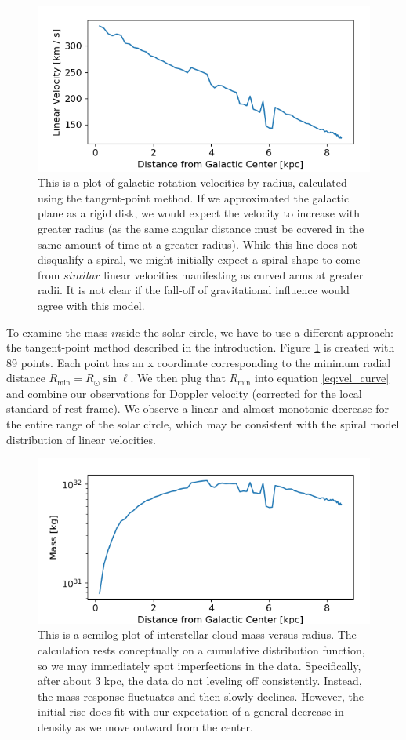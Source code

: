\documentclass[12pt]{article}
\begin{document}
\begin{figure}
	\centering
	\includegraphics[width=.8\linewidth]{inner_vel_distro}
	\caption{This is a plot of galactic rotation velocities by radius, calculated using the tangent-point method. If we approximated the galactic plane as a rigid disk, we would expect the velocity to increase with greater radius (as the same angular distance must be covered in the same amount of time at a greater radius). While this line does not disqualify a spiral, we might initially expect a spiral shape to come from $similar$ linear velocities manifesting as curved arms at greater radii. It is not clear if the fall-off of gravitational influence would agree with this model.}
	\label{fig:inner_vel_distro}
\end{figure}

To examine the mass $in$side the solar circle, we have to use a different approach: the tangent-point method described in the introduction. Figure \ref{fig:inner_vel_distro} is created with 89 points. Each point has an x coordinate corresponding to the minimum radial distance $R_\text{min} = R_\odot \sin \ell$. We then plug that $R_\text{min}$ into equation \ref{eq:vel_curve} and combine our observations for Doppler velocity (corrected for the local standard of rest frame). We observe a linear and almost monotonic decrease for the entire range of the solar circle, which may be consistent with the spiral model distribution of linear velocities.

\begin{figure}
	\centering
	\includegraphics[width=.8\linewidth]{inner_mass_distro}
	\caption{This is a semilog plot of interstellar cloud mass versus radius. The calculation rests conceptually on a cumulative distribution function, so we may immediately spot imperfections in the data. Specifically, after about 3 kpc, the data do not leveling off consistently. Instead, the mass response fluctuates and then slowly declines. However, the initial rise does fit with our expectation of a general decrease in density as we move outward from the center.}
	\label{fig:inner_mass_distro}
\end{figure}
\end{document}
